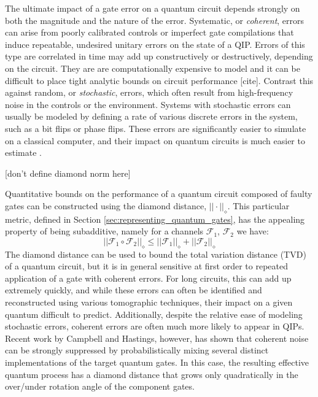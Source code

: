\documentclass[aps,nofootinbib,pra,notitlepage,twocolumn]{revtex4-1}
\newcommand{\note}[1]{{\color{red}[#1]}}
\begin{document}
The ultimate impact of a gate error on a quantum circuit depends strongly on both the magnitude and the nature of the error. Systematic, or \emph{coherent}, errors can arise from poorly calibrated controls or imperfect gate compilations that induce repeatable, undesired unitary errors on the state of a QIP. Errors of this type are correlated in time may add up constructively or destructively, depending on the circuit. They are are  computationally expensive to model and it can be difficult to place tight analytic bounds on circuit performance [cite]. Contrast this against random, or \emph{stochastic}, errors, which often result from high-frequency noise in the controls or the environment. Systems with stochastic errors can usually be modeled by defining a rate of various discrete errors in the system, such as a bit flips or phase flips. These errors are significantly easier to simulate on a classical computer, and their impact on quantum circuits is much easier to estimate \cite{Beale2018}.


\note{don't define diamond norm here}

Quantitative bounds on the performance of a quantum circuit composed of faulty gates can be constructed using the diamond distance, $||\cdot||_\diamond$. This particular metric, defined in Section \ref{sec:representing_quantum_gates}, has the appealing property of being subadditive, namely for a channels $\mathcal{F}_1$, $\mathcal{F}_2$ we have:
\begin{equation}
||\mathcal{F}_1\circ\mathcal{F}_2||_\diamond \leq ||\mathcal{F}_1||_\diamond + ||\mathcal{F}_2||_\diamond
\end{equation}
The diamond distance can be used to bound the total variation distance (TVD) of a quantum circuit, but it is in general sensitive at first order to repeated application of a gate with coherent errors. For long circuits, this can add up extremely quickly, and while these errors can often be identified and reconstructed using various tomographic techniques, their impact on a given quantum  difficult to predict. Additionally, despite the relative ease of modeling stochastic errors, coherent errors are often much more likely to appear in QIPs. Recent work by Campbell and Hastings\cite{Campbell2017, 1612.01011, 1811.08017}, however, has shown that coherent noise can be strongly suppressed by probabilistically mixing several distinct implementations of the target quantum gates. In this case, the resulting effective quantum process has a diamond distance that grows only quadratically in the over/under rotation angle of the component gates. 
\end{document}
